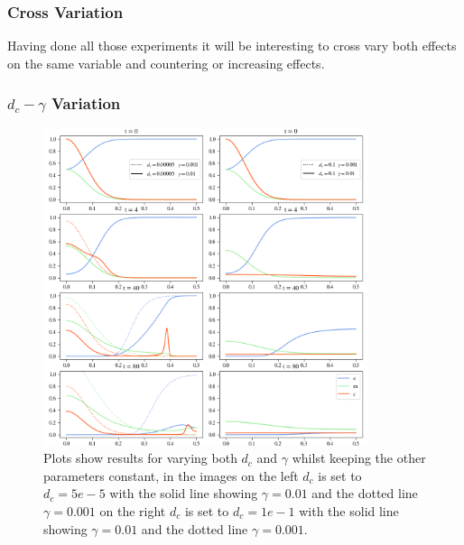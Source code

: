 \subsubsection*{Cross Variation}
Having done all those experiments it will be interesting to cross vary both effects on the same variable and countering or increasing effects.

\subsubsection*{$d_c - \gamma$ Variation}
\begin{figure}[h]
    \centering
    \includegraphics[width=0.85\textwidth]{resources/images/dc_gamma_variation.png}
    \caption{Plots show results for varying both $d_c$ and $\gamma$ whilst keeping the other parameters constant, in the images on the left $d_c$ is set to $d_c=5e-5$ with the solid line showing $\gamma = 0.01$ and the dotted line $\gamma=0.001$ on the right $d_c$ is set to $d_c=1e-1$ with the solid line showing $\gamma = 0.01$ and the dotted line $\gamma=0.001$.}
    \label{fig:dc_gamma_variation}
\end{figure}

